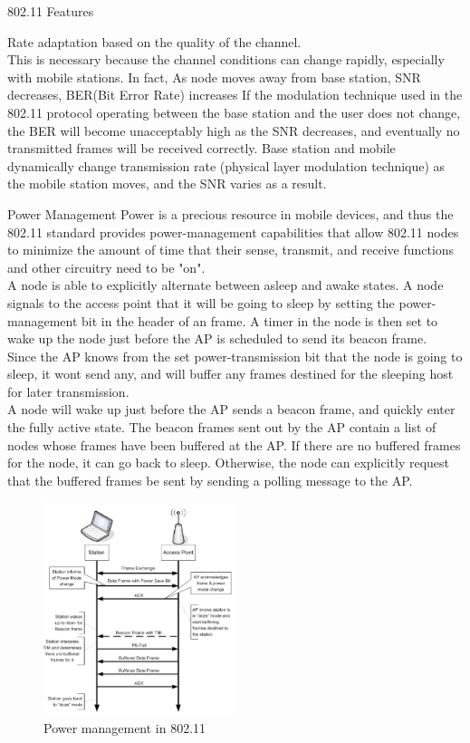 \begin{section}{802.11 Features}
\begin{subsection}{Rate adaptation}
    based on the quality of the channel.\\
    This is necessary because the channel conditions can change rapidly, especially with mobile
    stations. In fact, As node moves away from base station, SNR decreases, BER(Bit Error Rate) increases
    If the modulation technique used in the 802.11 protocol operating between the base
    station and the user does not change, the BER will become unacceptably high as the
    SNR decreases, and eventually no transmitted frames will be received correctly.
    Base station and mobile dynamically change transmission rate (physical layer modulation technique) 
    as the mobile station moves, and the SNR varies as a result.
  \end{subsection}
  \begin{subsection}{Power Management}
    \label{sub:power management}
    Power is a precious resource in mobile devices, and thus the 802.11 standard provides 
    power-management capabilities that allow 802.11 nodes to minimize the amount of time that 
    their sense, transmit, and receive functions and other circuitry need to be "on".\\
    A node is able to explicitly alternate between asleep and awake states. A node signals to the 
    access point that it will be going to sleep by setting the power-management bit in the header 
    of an frame. A timer in the node is then set to wake up the node just before the AP is 
    scheduled to send its beacon frame.\\
    Since the AP knows from the set power-transmission bit that the node is going to sleep, it wont
    send any, and will buffer any frames destined for the sleeping host for later transmission.\\ A
    node will wake up just before the AP sends a beacon frame, and quickly enter the fully active
    state.
    The beacon frames sent out by the AP contain a list of nodes whose frames have been buffered 
    at the AP. If there are no buffered frames for the node, it can go back to sleep. Otherwise, 
    the node can explicitly request that the buffered frames be sent by sending a polling message 
    to the AP.

    \begin{figure}[h]
      \centering
      \includegraphics[width=0.5\textwidth]{img/wireless/80211 power saving.png}
      \caption{Power management in 802.11}
    \end{figure}


\end{subsection}
\end{section}

